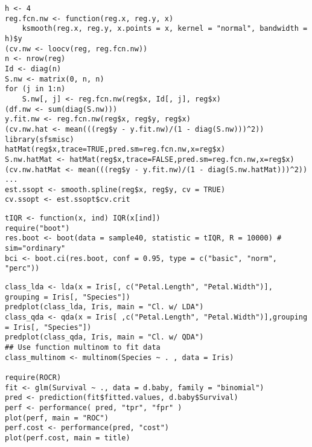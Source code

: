 \vspace{-14pt}

\begin{lstlisting}[style=RStyle, caption={CV},numbers=none]
h <- 4
reg.fcn.nw <- function(reg.x, reg.y, x)
    ksmooth(reg.x, reg.y, x.points = x, kernel = "normal", bandwidth = h)$y
(cv.nw <- loocv(reg, reg.fcn.nw))
n <- nrow(reg)
Id <- diag(n)
S.nw <- matrix(0, n, n)
for (j in 1:n)
    S.nw[, j] <- reg.fcn.nw(reg$x, Id[, j], reg$x)
(df.nw <- sum(diag(S.nw)))
y.fit.nw <- reg.fcn.nw(reg$x, reg$y, reg$x)
(cv.nw.hat <- mean(((reg$y - y.fit.nw)/(1 - diag(S.nw)))^2))
library(sfsmisc)
hatMat(reg$x,trace=TRUE,pred.sm=reg.fcn.nw,x=reg$x)
S.nw.hatMat <- hatMat(reg$x,trace=FALSE,pred.sm=reg.fcn.nw,x=reg$x)
(cv.nw.hatMat <- mean(((reg$y - y.fit.nw)/(1 - diag(S.nw.hatMat)))^2))
...
est.ssopt <- smooth.spline(reg$x, reg$y, cv = TRUE)
cv.ssopt <- est.ssopt$cv.crit
\end{lstlisting}

\vspace{-14pt}

\begin{lstlisting}[style=RStyle, caption={Bootstrapping},numbers=none]
tIQR <- function(x, ind) IQR(x[ind])
require("boot")
res.boot <- boot(data = sample40, statistic = tIQR, R = 10000) # sim="ordinary"
bci <- boot.ci(res.boot, conf = 0.95, type = c("basic", "norm", "perc"))
\end{lstlisting}

\vspace{-14pt}

\begin{lstlisting}[style=RStyle, caption={LDA, QDA, logistic regression and ROC Curve},numbers=none]
class_lda <- lda(x = Iris[, c("Petal.Length", "Petal.Width")], grouping = Iris[, "Species"])
predplot(class_lda, Iris, main = "Cl. w/ LDA")
class_qda <- qda(x = Iris[ ,c("Petal.Length", "Petal.Width")],grouping = Iris[, "Species"])
predplot(class_qda, Iris, main = "Cl. w/ QDA")
## Use function multinom to fit data
class_multinom <- multinom(Species ~ . , data = Iris)

require(ROCR)
fit <- glm(Survival ~ ., data = d.baby, family = "binomial")
pred <- prediction(fit$fitted.values, d.baby$Survival)
perf <- performance( pred, "tpr", "fpr" )
plot(perf, main = "ROC")
perf.cost <- performance(pred, "cost")
plot(perf.cost, main = title)
\end{lstlisting}

\vspace{-14pt}

